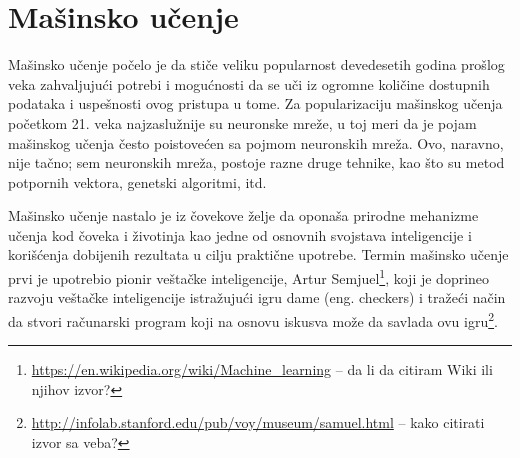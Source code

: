 \chapter{Mašinsko učenje}
\label{ch:ml}
Mašinsko učenje počelo je da stiče veliku popularnost devedesetih godina prošlog veka zahvaljujući potrebi i mogućnosti da se uči iz ogromne količine dostupnih podataka i uspešnosti ovog pristupa u tome. Za popularizaciju mašinskog učenja početkom 21. veka najzaslužnije su neuronske mreže, u toj meri da je pojam mašinskog učenja često poistovećen sa pojmom neuronskih mreža. Ovo, naravno, nije tačno; sem neuronskih mreža, postoje razne druge tehnike, kao što su metod potpornih vektora, genetski algoritmi, itd. \par

Mašinsko učenje nastalo je iz čovekove želje da oponaša prirodne mehanizme učenja kod čoveka i životinja kao jedne od osnovnih svojstava inteligencije i korišćenja dobijenih rezultata u cilju praktične upotrebe. Termin mašinsko učenje prvi je upotrebio pionir veštačke inteligencije, Artur Semjuel\footnote{\url{https://en.wikipedia.org/wiki/Machine_learning} -- da li da citiram Wiki ili njihov izvor?}, koji je doprineo razvoju veštačke inteligencije istražujući igru dame (eng. checkers) i tražeći način da stvori računarski program koji na osnovu iskusva može da savlada ovu igru\footnote{\url{http://infolab.stanford.edu/pub/voy/museum/samuel.html} -- kako citirati izvor sa veba?}. \par

